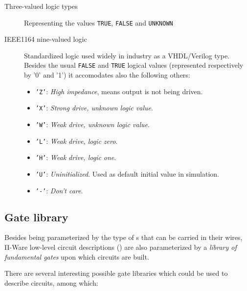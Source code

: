             \begin{description}
                \item[Three-valued logic types]
                    Representing the values \texttt{TRUE}, \texttt{FALSE} and \texttt{UNKNOWN}
                \item[IEEE1164 nine-valued logic]
                    Standardized logic used widely in industry as a VHDL/Verilog type.
                    Besides the usual \texttt{FALSE} and \texttt{TRUE} logical values
                    (represented respectively by '0' and '1')
                    it accomodates also the following others:
                    \begin{itemize}
                        \item \texttt{'Z'}: \emph{High impedance}, means output is not being driven.
                        \item \texttt{'X'}: \emph{Strong drive, unknown logic value}.
                        \item \texttt{'W'}: \emph{Weak drive, unknown logic value}.
                        \item \texttt{'L'}: \emph{Weak drive, logic zero}.
                        \item \texttt{'H'}: \emph{Weak drive, logic one}.
                        \item \texttt{'U'}: \emph{Uninitialized}. Used as default initial value in simulation.
                        \item \texttt{'-'}: \emph{Don't care}.
                    \end{itemize}
            \end{description}


        \subsection{Gate library}
        \label{subsec:gate-library}
            Besides being parameterized by the type of s that can be carried in their wires,
            Π-Ware low-level circuit descriptions () are also parameterized by
            a \emph{library of fundamental gates} upon which circuits are built.

            There are several interesting possible gate libraries which could be used to describe circuits,
            among which:

